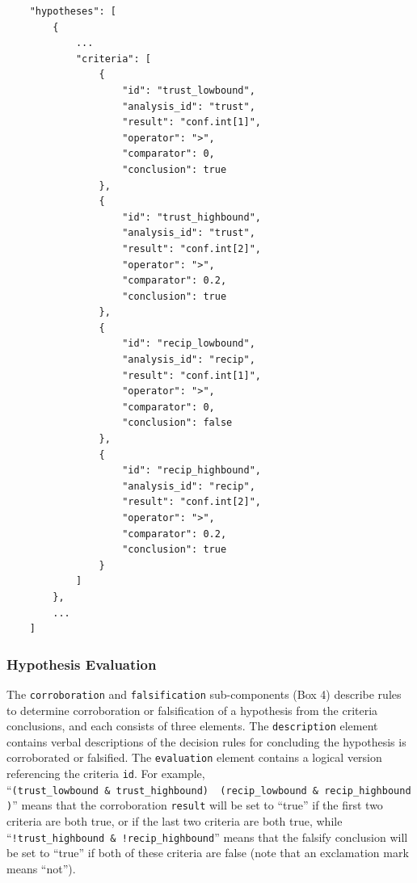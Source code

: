 \documentclass[
  english,
  doc,floatsintext]{apa6}
\begin{document}
\begin{tcolorbox}[colback=black!5!white,colframe=white!5!black,title=Box 3. Criteria for evaluation.]
\begin{verbatim}
    "hypotheses": [
        {
            ...
            "criteria": [
                {
                    "id": "trust_lowbound",
                    "analysis_id": "trust",
                    "result": "conf.int[1]",
                    "operator": ">",
                    "comparator": 0,
                    "conclusion": true
                },
                {
                    "id": "trust_highbound",
                    "analysis_id": "trust",
                    "result": "conf.int[2]",
                    "operator": ">",
                    "comparator": 0.2,
                    "conclusion": true
                },
                {
                    "id": "recip_lowbound",
                    "analysis_id": "recip",
                    "result": "conf.int[1]",
                    "operator": ">",
                    "comparator": 0,
                    "conclusion": false
                },
                {
                    "id": "recip_highbound",
                    "analysis_id": "recip",
                    "result": "conf.int[2]",
                    "operator": ">",
                    "comparator": 0.2,
                    "conclusion": true
                }
            ]
        },
        ...
    ]
\end{verbatim}
\end{tcolorbox}

\hypertarget{hypothesis-evaluation}{%
\subsubsection{Hypothesis Evaluation}\label{hypothesis-evaluation}}

The \texttt{corroboration} and \texttt{falsification} sub-components (Box 4) describe rules to determine corroboration or falsification of a hypothesis from the criteria conclusions, and each consists of three elements. The \texttt{description} element contains verbal descriptions of the decision rules for concluding the hypothesis is corroborated or falsified. The \texttt{evaluation} element contains a logical version referencing the criteria \texttt{id}. For example, \enquote{\texttt{(trust\_lowbound\ \&\ trust\_highbound)\ \textbar{}\ (recip\_lowbound\ \&\ recip\_highbound)}} means that the corroboration \texttt{result} will be set to \enquote{true} if the first two criteria are both true, or if the last two criteria are both true, while \enquote{\texttt{!trust\_highbound\ \&\ !recip\_highbound}} means that the falsify conclusion will be set to \enquote{true} if both of these criteria are false (note that an exclamation mark means \enquote{not}).
\end{document}
